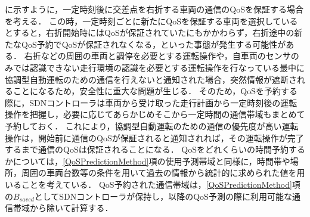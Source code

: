\documentclass[a4paper,11pt,uplatex]{ujreport}
\begin{document}
に示すように，一定時刻後に交差点を右折する車両の通信のQoSを保証する場合を考える．
この時，一定時刻ごとに新たにQoSを保証する車両を選択しているとすると，右折開始時にはQoSが保証されていたにもかかわらず，右折途中の新たなQoS予約でQoSが保証されなくなる，といった事態が発生する可能性がある．
右折などの周囲の車両と調停を必要とする運転操作や，自車両のセンサのみでは認識できない走行環境の認識を必要とする運転操作を行なっている最中に協調型自動運転のための通信を行えないと通知された場合，突然情報が遮断されることになるため，安全性に重大な問題が生じる．
そのため，QoSを予約する際に，SDNコントローラは車両から受け取った走行計画から一定時刻後の運転操作を把握し，必要に応じてあらかじめそこから一定時間の通信帯域もまとめて予約しておく．
これにより，協調型自動運転のための通信の優先度が高い運転操作は，開始前に通信のQoSが保証されると通知されれば，その運転操作が完了するまで通信のQoSは保証されることになる．
QoSをどれくらいの時間予約するかについては，\ref{QoSPredictionMethod}項の使用予測帯域と同様に，時間帯や場所，周囲の車両台数等の条件を用いて過去の情報から統計的に求められた値を用いることを考えている．
QoS予約された通信帯域は，\ref{QoSPredictionMethod}項の$B_{saved}$としてSDNコントローラが保持し，以降のQoS予測の際に利用可能な通信帯域から除いて計算する．






\end{document}
